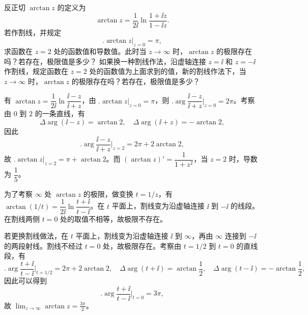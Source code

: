 \begin{question}
反正切 \(\arctan z\) 的定义为
\[
\arctan z = \frac{1}{2\ii}\ln\frac{1+\ii z}{1-\ii z}.
\]
若作割线，并规定
\[
\bigl.\arctan z\bigr|_{z=0} = \pi,
\]
求函数在 \(z=2\) 处的函数值和导数值。此时当 \(z\to\infty\) 时，\(\arctan z\) 的极限存在吗？若存在，极限值是多少？
如果换一种割线作法，沿虚轴连接 \(z=\ii\) 和 \(z=-\ii\) 作割线，规定函数在 \(z=2\) 处的函数值为上面求到的值，新的割线作法下，当 \(z\to\infty\) 时，\(\arctan z\) 的极限存在吗？若存在，极限值是多少？

\begin{center}
\end{center}

\begin{solution}
有 \(\arctan z = \dfrac{1}{2\ii}\ln\dfrac{\ii-z}{\ii+z}\)，由 \(\bigl.\arctan z\bigr|_{z=0}=\pi\)，则 \(\bigl.\arg\dfrac{\ii-z}{\ii+z}\bigr|_{z=0}=2\pi\)。考察由 \(0\) 到 \(2\) 的一条直线，有
\[
\Delta\arg(\ii-z)=\arctan 2,\quad \Delta\arg(\ii+z)=-\arctan 2,
\]
因此
\[
\bigl.\arg\frac{\ii-z}{\ii+z}\bigr|_{z=2}=2\pi+2\arctan 2,
\]
故 \(\bigl.\arctan z\bigr|_{z=2}=\pi+\arctan 2\)。而 \((\arctan z)'=\dfrac{1}{1+z^2}\)，当 \(z=2\) 时，导数为 \(\dfrac15\)。

为了考察 \(\infty\) 处 \(\arctan z\) 的极限，做变换 \(t=1/z\)，有 \(\arctan(1/t)=\dfrac{1}{2\ii}\ln\dfrac{t+\ii}{t-\ii}\)。在 \(t\) 平面上，割线变为沿虚轴连接 \(\ii\) 到 \(-\ii\) 的线段。在割线两侧 \(t=0\) 处的取值不相等，故极限不存在。

若更换割线做法，在 \(t\) 平面上，割线变为沿虚轴连接 \(\ii\) 到 \(\infty\)，再由 \(\infty\) 连接到 \(-\ii\) 的两段射线。割线不经过 \(t=0\) 处，故极限存在。考察由 \(t=1/2\) 到 \(t=0\) 的直线段，有
\[
\bigl.\arg\frac{t+\ii}{t-\ii}\bigr|_{t=1/2}=2\pi+2\arctan 2,\quad
\Delta\arg(t+\ii)=\arctan\frac12,\quad
\Delta\arg(t-\ii)=-\arctan\frac12,
\]
因此可以得到
\[
\bigl.\arg\frac{t+\ii}{t-\ii}\bigr|_{t=0}=3\pi,
\]
故 \(\displaystyle\lim_{z\to\infty}\arctan z=\frac{3\pi}{2}\)。
\end{solution}
\end{question}

